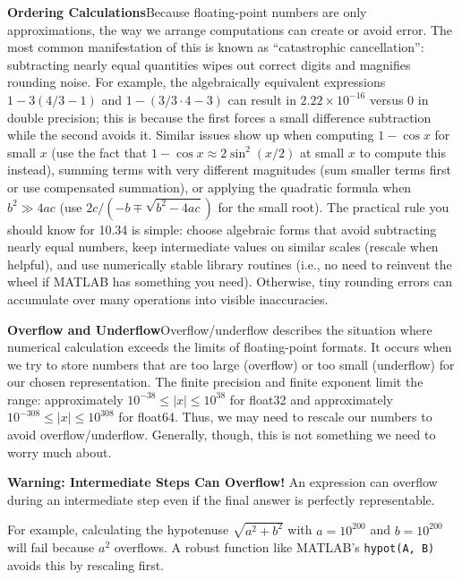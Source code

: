 \textbf{Ordering Calculations}\quad Because floating-point numbers are only approximations, the way we arrange computations can create or avoid error. The most common manifestation of this is known as ``catastrophic cancellation'': subtracting nearly equal quantities wipes out correct digits and magnifies rounding noise. For example, the algebraically equivalent expressions $1-3(4/3-1)$ and $1-(3/3\cdot 4-3)$ can result in $2.22\times10^{-16}$ versus $0$ in double precision; this is because the first forces a small difference subtraction while the second avoids it. Similar issues show up when computing $1-\cos x$ for small $x$ (use the fact that $1-\cos x \approx 2\sin^2(x/2)$ at small $x$ to compute this instead), summing terms with very different magnitudes (sum smaller terms first or use compensated summation), or applying the quadratic formula when $b^2\gg4ac$ (use $2c/(-b\mp\sqrt{b^2-4ac})$ for the small root). The practical rule you should know for 10.34 is simple: choose algebraic forms that avoid subtracting nearly equal numbers, keep intermediate values on similar scales (rescale when helpful), and use numerically stable library routines (i.e., no need to reinvent the wheel if MATLAB has something you need). Otherwise, tiny rounding errors can accumulate over many operations into visible inaccuracies.

\textbf{Overflow and Underflow}\quad  Overflow/underflow describes the situation where numerical calculation exceeds the limits of floating-point formats. It occurs when we try to store numbers that are too large (overflow) or too small (underflow) for our chosen representation. The finite precision and finite exponent limit the range: approximately $10^{-38} \leq |x| \leq 10^{38}$ for float32 and approximately $10^{-308} \leq |x| \leq 10^{308}$ for float64. Thus, we may need to rescale our numbers to avoid overflow/underflow. Generally, though, this is not something we need to worry much about.

\begin{warningBox}
    \textbf{Warning: Intermediate Steps Can Overflow!}
    An expression can overflow during an intermediate step even if the final answer is perfectly representable.

    For example, calculating the hypotenuse $\sqrt{a^2 + b^2}$ with $a=10^{200}$ and $b=10^{200}$ will fail because $a^2$ overflows. A robust function like MATLAB's \texttt{hypot(A, B)} avoids this by rescaling first.
\end{warningBox}

